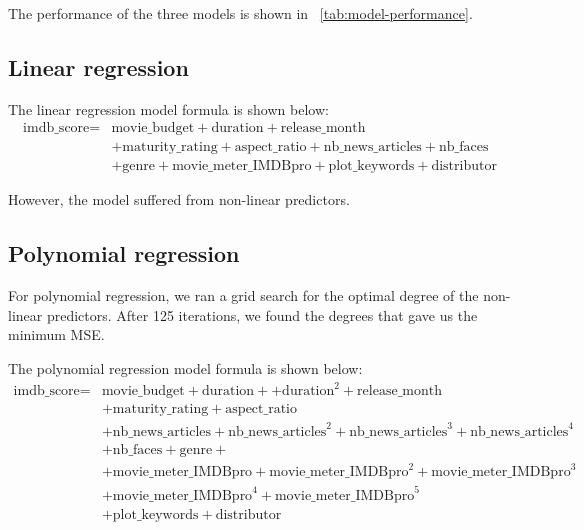 \documentclass[12pt,a4paper]{article}
\begin{document}
The performance of the three models is shown in \tablename~\ref{tab:model-performance}.

\subsection{Linear regression}\label{subsec:linear-regression}
The linear regression model formula is shown below:
\begin{equation*}
    \begin{split}
        \text{imdb\_score} = & \text{movie\_budget} + \text{duration} + \text{release\_month}                                  \\
                             & + \text{maturity\_rating} + \text{aspect\_ratio} + \text{nb\_news\_articles} + \text{nb\_faces} \\
                             & + \text{genre} + \text{movie\_meter\_IMDBpro} + \text{plot\_keywords} + \text{distributor}
    \end{split}
\end{equation*}

However, the model suffered from non-linear predictors.

\subsection{Polynomial regression}\label{subsec:polynomial-regression}
For polynomial regression, we ran a grid search for the optimal degree of the non-linear predictors.
After 125 iterations, we found the degrees that gave us the minimum MSE.

The polynomial regression model formula is shown below:
\begin{equation*}
    \begin{split}
        \text{imdb\_score} = & \text{movie\_budget} + \text{duration} + + \text{duration}^2 + \text{release\_month}                                  \\
                             & + \text{maturity\_rating} + \text{aspect\_ratio}                                                                      \\
                             & + \text{nb\_news\_articles} + \text{nb\_news\_articles}^2 + \text{nb\_news\_articles}^3 + \text{nb\_news\_articles}^4 \\
                             & + \text{nb\_faces} + \text{genre} +                                                                                   \\
                             & + \text{movie\_meter\_IMDBpro} + \text{movie\_meter\_IMDBpro}^2 + \text{movie\_meter\_IMDBpro}^3                      \\
                             & + \text{movie\_meter\_IMDBpro}^4 + \text{movie\_meter\_IMDBpro}^5                                                     \\
                             & + \text{plot\_keywords} + \text{distributor}
    \end{split}
\end{equation*}
\end{document}
